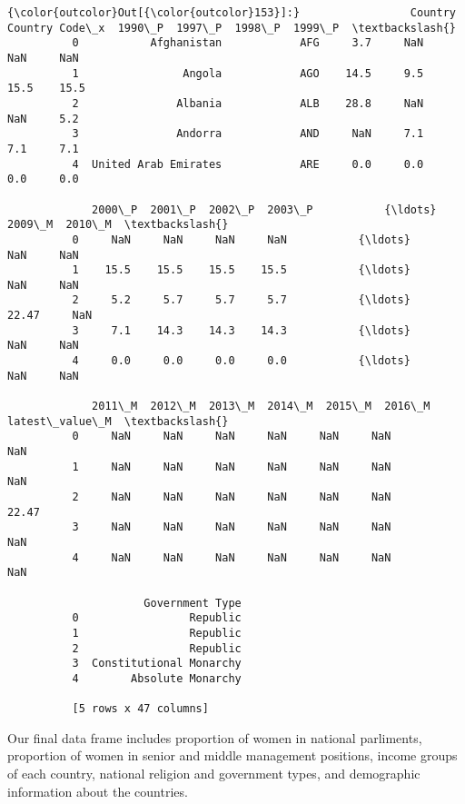 \documentclass[11pt]{article}
\begin{document}
\begin{Verbatim}[commandchars=\\\{\}]
{\color{outcolor}Out[{\color{outcolor}153}]:}                 Country Country Code\_x  1990\_P  1997\_P  1998\_P  1999\_P  \textbackslash{}
          0           Afghanistan            AFG     3.7     NaN     NaN     NaN   
          1                Angola            AGO    14.5     9.5    15.5    15.5   
          2               Albania            ALB    28.8     NaN     NaN     5.2   
          3               Andorra            AND     NaN     7.1     7.1     7.1   
          4  United Arab Emirates            ARE     0.0     0.0     0.0     0.0   
          
             2000\_P  2001\_P  2002\_P  2003\_P           {\ldots}             2009\_M  2010\_M  \textbackslash{}
          0     NaN     NaN     NaN     NaN           {\ldots}                NaN     NaN   
          1    15.5    15.5    15.5    15.5           {\ldots}                NaN     NaN   
          2     5.2     5.7     5.7     5.7           {\ldots}              22.47     NaN   
          3     7.1    14.3    14.3    14.3           {\ldots}                NaN     NaN   
          4     0.0     0.0     0.0     0.0           {\ldots}                NaN     NaN   
          
             2011\_M  2012\_M  2013\_M  2014\_M  2015\_M  2016\_M  latest\_value\_M  \textbackslash{}
          0     NaN     NaN     NaN     NaN     NaN     NaN             NaN   
          1     NaN     NaN     NaN     NaN     NaN     NaN             NaN   
          2     NaN     NaN     NaN     NaN     NaN     NaN           22.47   
          3     NaN     NaN     NaN     NaN     NaN     NaN             NaN   
          4     NaN     NaN     NaN     NaN     NaN     NaN             NaN   
          
                     Government Type  
          0                 Republic  
          1                 Republic  
          2                 Republic  
          3  Constitutional Monarchy  
          4        Absolute Monarchy  
          
          [5 rows x 47 columns]
\end{Verbatim}
            
    Our final data frame includes proportion of women in national
parliments, proportion of women in senior and middle management
positions, income groups of each country, national religion and
government types, and demographic information about the countries.
\end{document}
